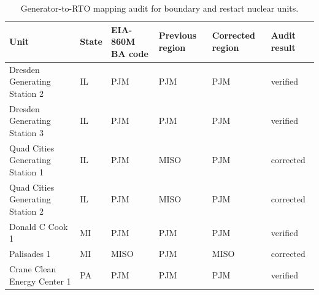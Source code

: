 \begin{table}[H]
\centering
\caption{Generator-to-RTO mapping audit for boundary and restart nuclear units.}
\label{tab:nuclear-rto-mapping-audit}
\scriptsize
\begin{tabular}{llllll}
\toprule
Unit & State & EIA-860M BA code & Previous region & Corrected region & Audit result \\
\midrule
Dresden Generating Station 2 & IL & PJM & PJM & PJM & verified \\
Dresden Generating Station 3 & IL & PJM & PJM & PJM & verified \\
Quad Cities Generating Station 1 & IL & PJM & MISO & PJM & corrected \\
Quad Cities Generating Station 2 & IL & PJM & MISO & PJM & corrected \\
Donald C Cook 1 & MI & PJM & PJM & PJM & verified \\
Palisades 1 & MI & MISO & PJM & MISO & corrected \\
Crane Clean Energy Center 1 & PA & PJM & PJM & PJM & verified \\
\bottomrule
\end{tabular}
\end{table}
